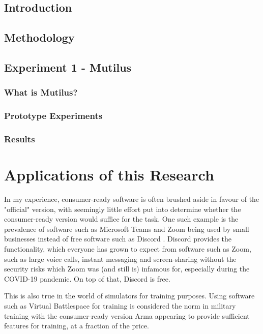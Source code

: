 \documentclass[12pt]{article}
\begin{document}
\subsection{Introduction}

\subsection{Methodology}

\subsection{Experiment 1 - Mutilus}

\subsubsection{What is Mutilus?}

\subsubsection{Prototype Experiments}



\subsubsection{Results}

\section{Applications of this Research}

In my experience, consumer-ready software is often brushed aside in favour of the "official" version, with seemingly little effort put into determine whether the consumer-ready version would suffice for the task. One such example is the prevalence of software such as Microsoft Teams \cite{MicrosoftTeams} and Zoom \cite{Zoom} being used by small businesses instead of free software such as Discord \cite{Discord}. Discord provides the functionality, which everyone has grown to expect from software such as Zoom, such as large voice calls, instant messaging and screen-sharing without the security risks which Zoom was (and still is) infamous for, especially during the COVID-19 pandemic. On top of that, Discord is free. 

This is also true in the world of simulators for training purposes. Using software such as Virtual Battlespace for training is considered the norm in military training with the consumer-ready version Arma appearing to provide sufficient features for training, at a fraction of the price. 
\end{document}

